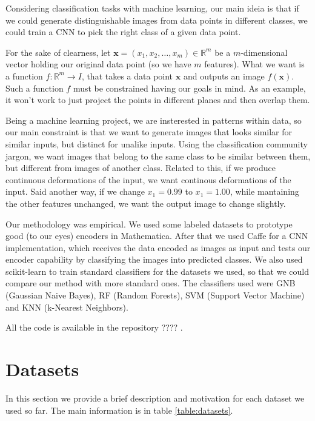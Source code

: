 \documentclass[11pt]{article}
\begin{document}
Considering classification tasks with machine learning, our main ideia is that if we could generate distinguishable images from data points in different classes, we could train a CNN to pick the right class of a given data point. 

For the sake of clearness, let $\mathbf{x} = (x_1, x_2, \dots, x_m) \in \mathbb{R}^m$ be a $m$-dimensional vector holding our original data point (so we have $m$ features). What we want is a function $f: \mathbb{R}^m \rightarrow I$, that takes a data point $\mathbf{x}$ and outputs an image $f(\mathbf{x})$. Such a function $f$ must be constrained having our goals in mind. As an example, it won't work to just project the points in different planes and then overlap them.

Being a machine learning project, we are insterested in patterns within data, so our main constraint is that we want to generate images that looks similar for similar inputs, but distinct for unalike inputs. Using the classification community jargon, we want images that belong to the same class to be similar between them, but different from images of another class. Related to this, if we produce continuous deformations of the input, we want continous deformations of the input. Said another way, if we change $x_1 = 0.99$ to $x_1 = 1.00$, while mantaining the other features unchanged, we want the output image to change slightly.

Our methodology was empirical. We used some labeled datasets to prototype good (to our eyes) encoders in Mathematica. After that we used Caffe for a CNN implementation, which receives the data encoded as images as input and tests our encoder capability by classifying the images into predicted classes. We also used scikit-learn to train standard classifiers for the datasets we used, so that we could compare our method with more standard ones. The classifiers used were GNB (Gaussian Naive Bayes), RF (Random Forests), SVM (Support Vector Machine) and KNN (k-Nearest Neighbors).

All the code is available in the repository ???? .

\section{Datasets} \label{sec:datasets}

In this section we provide a brief description and motivation for each dataset we used so far. The main information is in table \ref{table:datasets}.
\end{document}
